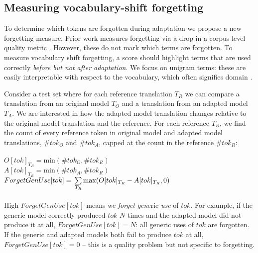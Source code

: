 \documentclass[11pt]{article}
\begin{document}
\subsection{Measuring vocabulary-shift forgetting}
To determine which tokens are forgotten during adaptation we propose a new forgetting measure. Prior work measures forgetting via a drop in a corpus-level quality metric  \cite{thompson-etal-2019-overcoming,gu-feng-2020-investigating}. However, these do not mark which terms are forgotten. To measure vocabulary shift forgetting, a score should highlight terms that are used correctly \emph{before but not after adaptation}. We focus on unigram terms: these are easily interpretable with respect to the vocabulary, which often signifies domain \cite{van-der-wees-etal-2015-whats}.


Consider a test set where for each reference translation $T_R$ we can compare a translation from an original model $T_O$ and a translation from an adapted model $T_A$. We are interested in how the adapted model translation changes relative to the original model translation and the reference. For each reference $T_R$, we find the count of every reference token in original model and adapted model translations, $\#tok_O$ and $\#tok_A$, capped at the count in the reference $\#tok_R$:
\\\\
$O[tok]_{T_R} =  \text{min}(\#tok_O, \#tok_R)$\\
$A[tok]_{T_R} =  \text{min}(\#tok_A, \#tok_R)$\\
$ForgetGenUse[tok] = \\
\null\hfill \sum\limits_{T_R} \text{max}(O[tok]_{T_R} - A[tok]_{T_R}, 0) $
\\\\
High $ForgetGenUse[tok]$ means we \emph{forget} \emph{gen}eric \emph{use} of $tok$. For example, if the generic model correctly produced $tok$ $N$ times and the adapted model did not produce it at all,  $ForgetGenUse[tok]=N$: all generic uses of $tok$ are forgotten. If the generic and adapted models both fail to produce $tok$ at  all, $ForgetGenUse[tok]=0$ -- this is a quality problem but not specific to forgetting.
\end{document}
